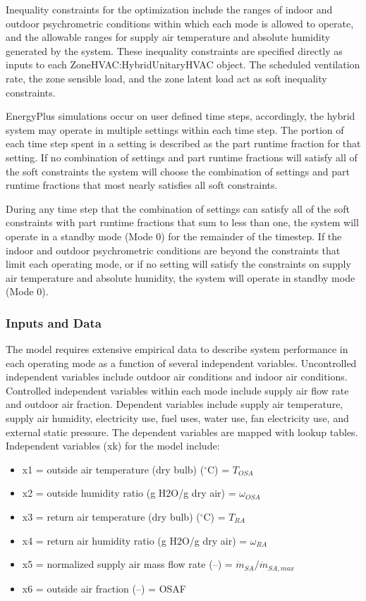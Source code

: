Inequality constraints for the optimization include the ranges of indoor and outdoor psychrometric conditions within which each mode is allowed to operate, and the allowable ranges for supply air temperature and absolute humidity generated by the system. These inequality constraints are specified directly as inputs to each ZoneHVAC:HybridUnitaryHVAC object. The scheduled ventilation rate, the zone sensible load, and the zone latent load act as soft inequality constraints.

EnergyPlus simulations occur on user defined time steps, accordingly, the hybrid system may operate in multiple settings within each time step. The portion of each time step spent in a setting is described as the part runtime fraction for that setting. If no combination of settings and part runtime fractions will satisfy all of  the soft constraints the system will choose the combination of settings and part runtime fractions that most nearly satisfies all soft constraints.

During any time step that the combination of settings can satisfy all of the soft constraints with part runtime fractions that sum to less than one, the system will operate in a standby mode (Mode 0) for the remainder of the timestep. If the indoor and outdoor psychrometric conditions are beyond the constraints that limit each operating mode, or if no setting will satisfy the constraints on supply air temperature and absolute humidity, the system will operate in standby mode (Mode 0).

\subsubsection{Inputs and Data}
The model requires extensive empirical data to describe system performance in each operating mode as a function of several independent variables. Uncontrolled independent variables include outdoor air conditions and indoor air conditions. Controlled independent variables within each mode include supply air flow rate and outdoor air fraction. Dependent variables include supply air temperature, supply air humidity, electricity use, fuel uses, water use, fan electricity use, and external static pressure.  The dependent variables are mapped with lookup tables.
Independent variables (xk) for the model include:
\begin{itemize}
 \item x1 = outside air temperature (dry bulb) ($^{\circ}$C) = \({T_{OSA}}\)
 \item x2 = outside humidity ratio (g H2O/g dry air) = \({\omega_{OSA}}\)
 \item x3 = return air temperature (dry bulb) ($^{\circ}$C) = \(T_{RA}\)
 \item x4 = return air humidity ratio  (g H2O/g dry air) = \({\omega_{RA}}\)
 \item x5 = normalized supply air mass flow rate (–) = \(\dot m_{SA}/{\dot m_{SA,max}}\)
 \item x6 = outside air fraction (–) = OSAF
\end{itemize}

